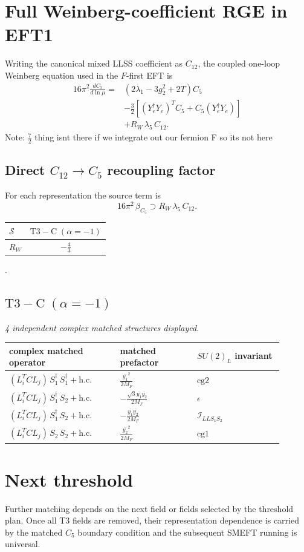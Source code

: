 \documentclass[9pt]{article}
\begin{document}
\section*{Full Weinberg-coefficient RGE in EFT1}
Writing the canonical mixed LLSS coefficient as $C_{12}$, the coupled one-loop Weinberg equation used in the $F$-first EFT is
\begin{align}
16\pi^2\frac{dC_5}{d\ln\mu}={}&(2\lambda_1-3g_2^2+2T)C_5\\
&-\frac32\left[(Y_e^\dagger Y_e)^T C_5+C_5(Y_e^\dagger Y_e)\right]\\
&+R_W\,\lambda_5\,C_{12}.
\end{align}
Note: $\frac{7}{2}$ thing isnt there if we integrate out our fermion F so its not here \subsection*{Direct $C_{12}\to C_5$ recoupling factor}
For each representation the source term is
\[16\pi^2\,\beta_{C_5}\supset R_W\,\lambda_5\,C_{12}.\]
\begin{longtable}{@{}lc@{}}
\toprule
$\mathcal{S}$ & $ \mathrm{T3-C}\;(\alpha=-1) $ \\
\midrule
$R_W$ & $ - \frac{4}{3} $ \\
\bottomrule
\end{longtable}
.
\subsection*{$ \mathrm{T3-C}\;(\alpha=-1) $}
\textit{4 independent complex matched structures displayed. }
\begin{longtable}{@{}p{0.36\linewidth}p{0.25\linewidth}p{0.29\linewidth}@{}}
\toprule
complex matched operator & matched prefactor & $SU(2)_L$ invariant \\
\midrule
$ (L_i^T C L_j)\,S_1^\dagger\,S_1^\dagger+\mathrm{h.c.} $ & $ \frac{\overline{y_{1}}^{2}}{2 M_F} $ & $ \mathrm{cg2} $ \\
$ (L_i^T C L_j)\,S_1^\dagger\,S_2+\mathrm{h.c.} $ & $ - \frac{\sqrt{3} \overline{y_{1}} \overline{y_{2}}}{2 M_F} $ & $ \epsilon $ \\
$ (L_i^T C L_j)\,S_1^\dagger\,S_2+\mathrm{h.c.} $ & $ - \frac{\overline{y_{1}} \overline{y_{2}}}{2 M_F} $ & $ \mathcal{I}_{LLS_1S_2} $ \\
$ (L_i^T C L_j)\,S_2\,S_2+\mathrm{h.c.} $ & $ \frac{\overline{y_{2}}^{2}}{2 M_F} $ & $ \mathrm{cg1} $ \\
\bottomrule
\end{longtable}
\section*{Next threshold}
Further matching depends on the next field or fields selected by the threshold plan.  Once all T3 fields are removed, their representation dependence is carried by the matched $C_5$ boundary condition and the subsequent SMEFT running is universal.
\end{document}
